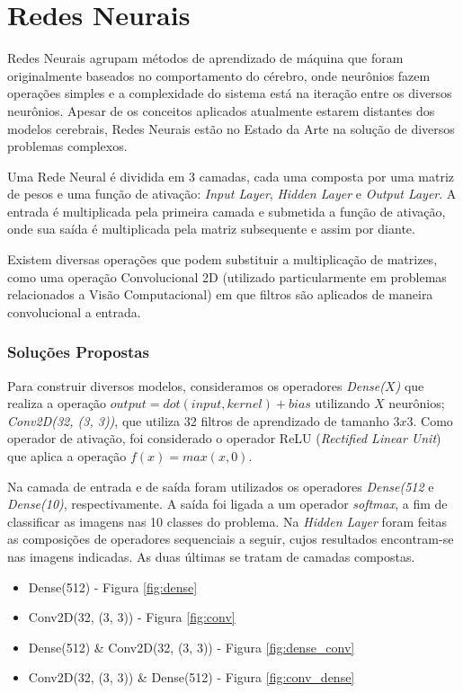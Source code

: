 \documentclass[conference]{IEEEtran}
\begin{document}
\section{Redes Neurais}
Redes Neurais agrupam métodos de aprendizado de máquina que foram originalmente baseados no comportamento do cérebro, onde neurônios fazem operações simples e a complexidade do sistema está na iteração entre os diversos neurônios. Apesar de os conceitos aplicados atualmente estarem distantes dos modelos cerebrais, Redes Neurais estão no Estado da Arte na solução de diversos problemas complexos. 

Uma Rede Neural é dividida em 3 camadas, cada uma composta por uma matriz de pesos e uma função de ativação: \textit{Input Layer}, \textit{Hidden Layer} e \textit{Output Layer}. A entrada é multiplicada pela primeira camada e submetida a função de ativação, onde sua saída é multiplicada pela matriz subsequente e assim por diante. 

Existem diversas operações que podem substituir a multiplicação de matrizes, como uma operação Convolucional 2D (utilizado particularmente em problemas relacionados a Visão Computacional) em que filtros são aplicados de maneira convolucional a entrada. 

\subsubsection{Soluções Propostas}
Para construir diversos modelos, consideramos os operadores \textit{Dense($X$)} que realiza a operação $output = dot(input, kernel) + bias$ utilizando $X$ neurônios; \textit{Conv2D(32, (3, 3))}, que utiliza 32 filtros de aprendizado de tamanho $3x3$. Como operador de ativação, foi considerado o operador ReLU (\textit{Rectified Linear Unit}) que aplica a operação $f(x) = max(x, 0)$. 

Na camada de entrada e de saída foram utilizados os operadores \textit{Dense(512} e \textit{Dense(10)}, respectivamente. A saída foi ligada a um operador \textit{softmax}, a fim de classificar as imagens nas 10 classes do problema. Na \textit{Hidden Layer} foram feitas as composições de operadores sequenciais a seguir, cujos resultados encontram-se nas imagens indicadas. As duas últimas se tratam de camadas compostas.

\begin{itemize}
	\item Dense(512) - Figura \ref{fig:dense}
	\item Conv2D(32, (3, 3)) - Figura \ref{fig:conv}
	\item Dense(512) \& Conv2D(32, (3, 3)) - Figura \ref{fig:dense_conv}
	\item Conv2D(32, (3, 3)) \& Dense(512) - Figura \ref{fig:conv_dense}
\end{itemize}
\end{document}
